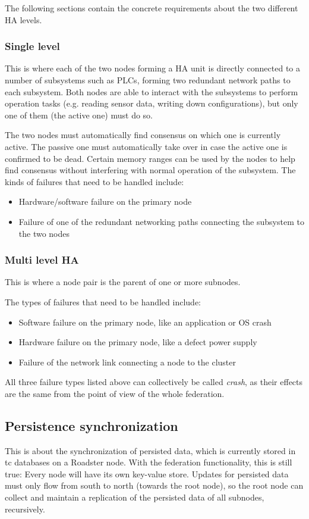 The following sections contain the concrete requirements about the two
different \gls{HA} levels.

\subsubsection{Single level}
This is where each of the two nodes forming a HA unit is directly connected to a number of
subsystems such as \glspl{PLC}, forming two redundant network paths to each
subsystem. Both nodes are able to interact with the subsystems to perform
operation tasks (e.g. reading sensor data, writing down configurations), but
only one of them (the active one) must do so.

The two nodes must automatically find consensus on which one is currently active. The
passive one must automatically take over in case the active one is confirmed to
be dead. Certain memory ranges can be used by the nodes to help find consensus
without interfering with normal operation of the subsystem. The kinds of
failures that need to be handled include:
\begin{itemize}
	\item Hardware/software failure on the primary node
	\item Failure of one of the redundant networking paths connecting the subsystem to the two nodes
\end{itemize}


\subsubsection{Multi level HA}
This is where a node pair is the parent of one or more subnodes.

The types of failures that need to be handled include:
\begin{itemize}
	\item Software failure on the primary node, like an application or OS crash
	\item Hardware failure on the primary node, like a defect power supply
	\item Failure of the network link connecting a node to the cluster
\end{itemize}

All three failure types listed above can collectively be called \emph{crash},
as their effects are the same from the point of view of the whole federation.

\subsection{Persistence synchronization}
This is about the synchronization of persisted data, which is currently stored
in \gls{tc} databases on a Roadster node. With the federation functionality, this is
still true: Every node will have its own key-value store. Updates for persisted
data must only flow from south to north (towards the root node), so the root
node can collect and maintain a replication of the persisted data of all
subnodes, recursively.

